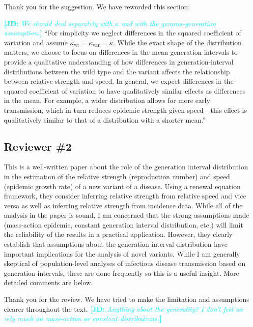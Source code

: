 \documentclass[12pt]{article}
\newcommand{\rev}{\subsection*}
\newcommand{\revtext}{\textsf}
\newcommand{\comment}[3]{\textcolor{#1}{\textbf{[#2: }\textsl{#3}\textbf{]}}}
\newcommand{\jd}[1]{\comment{cyan}{JD}{#1}}
\begin{document}
Thank you for the suggestion. We have reworded this section:

\jd{We should deal separately with $\kappa$ and with the gamma-generation assumption.}
``For simplicity we neglect differences in the squared coefficient of variation and assume $\kappa_{\mathrm{wt}} = \kappa_{\mathrm{var}} = \kappa$.
While the exact shape of the distribution matters, we choose to focus on differences in the mean generation intervals to provide a qualitative understanding of how differences in generation-interval distributions between the wild type and the variant affects the relationship between relative strength and speed.
In general, we expect  differences in the squared coefficient of variation to have qualitatively similar effects as differences in the mean.
For example, a wider distribution allows for more early transmission, which in turn reduces epidemic strength given speed---this effect is qualitatively similar to that of a distribution with a shorter mean.''

\rev{Reviewer \#2}

\revtext{This is a well-written paper about the role of the generation interval distribution in the estimation of the relative strength (reproduction number) and speed
(epidemic growth rate) of a new variant of a disease. Using a renewal equation
framework, they consider inferring relative strength from relative speed and vice
versa as well as inferring relative strength from incidence data. While all of the
analysis in the paper is sound, I am concerned that the strong assumptions made
(mass-action epidemic, constant generation interval distribution, etc.) will limit
the reliability of the results in a practical application. However, they clearly
establish that assumptions about the generation interval distribution have important implications for the analysis of novel variants. While I am generally
skeptical of population-level analyses of infectious disease transmission based
on generation intervals, these are done frequently so this is a useful insight.
More detailed comments are below.}

Thank you for the review. We have tried to make the limitation and assumptions clearer throughout the text. \jd{Anything about the generality? I don't feel we rely much on mass-action or constant distributions.}
\end{document}
